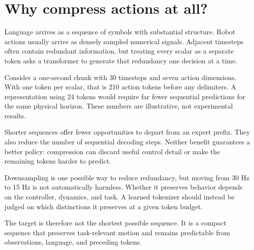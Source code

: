 \section{Why compress actions at all?}

Language arrives as a sequence of symbols with substantial structure. Robot
actions usually arrive as densely sampled numerical signals. Adjacent timesteps
often contain redundant information, but treating every scalar as a separate
token asks a transformer to generate that redundancy one decision at a time.

Consider a one-second chunk with 30 timesteps and seven action dimensions. With
one token per scalar, that is 210 action tokens before any delimiters. A
representation using 24 tokens would require far fewer sequential predictions
for the same physical horizon. These numbers are illustrative, not experimental
results.

Shorter sequences offer fewer opportunities to depart from an expert prefix.
They also reduce the number of sequential decoding steps. Neither benefit
guarantees a better policy: compression can discard useful control detail or
make the remaining tokens harder to predict.

Downsampling is one possible way to reduce redundancy, but moving from 30 Hz to
15 Hz is not automatically harmless. Whether it preserves behavior depends on
the controller, dynamics, and task. A learned tokenizer should instead be judged
on which distinctions it preserves at a given token budget.

The target is therefore not the shortest possible sequence. It is a compact
sequence that preserves task-relevant motion and remains predictable from
observations, language, and preceding tokens.

